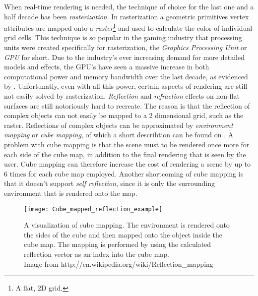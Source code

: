 When real-time rendering is needed, the technique of choice for the last one and
a half decade has been \textit{rasterization}. In rasterization a geometric
primitives vertex attributes are mapped onto a \textit{raster}\footnote{A flat,
  2D grid.} and used to calculate the color of individual grid cells. This
technique is so popular in the gaming industry that processing units were
created specifically for rasterization, the \textit{Graphics Processing Unit} or
\textit{GPU} for short. Due to the industry's ever increasing demand for more
detailed models and effects, the GPU's have seen a massive increase in both
computational power and memory bandwidth over the last decade, as evidenced by
. Unfortunatly, even with all this power, certain
aspects of rendering are still not easily solved by
rasterization. \textit{Reflection} and \textit{refraction} effects on non-flat
surfaces are still notoriously hard to recreate. The reason is that the
reflection of complex objects can not easily be mapped to a 2 dimensional grid,
such as the raster. Reflections of complex objects can be approximated by
\textit{environment mapping} or \textit{cube mapping}, of which a short
describtion can be found on . A problem with cube mapping is
that the scene must to be rendered once more for each side of the cube map, in
addition to the final rendering that is seen by the user. Cube mapping can
therefore increase the cost of rendering a scene by up to 6 times for each cube
map employed. Another shortcoming of cube mapping is that it doesn't support
\textit{self reflection}, since it is only the surrounding environment that is
rendered onto the map.

\begin{figure}
  \centering
  \texttt{[image: Cube\_mapped\_reflection\_example]}

  \vspace{3mm}
  \parbox{9.5cm}{\caption[Cube mapping visualized.]{A visualization of cube
      mapping. The environment is rendered onto the sides of the cube and then
      mapped onto the object inside the cube map. The mapping is performed by
      using the calculated reflection vector as an index into the cube
      map.\\Image from
      http://en.wikipedia.org/wiki/Reflection\_mapping}\label{fig:cubemap}}
\end{figure}


